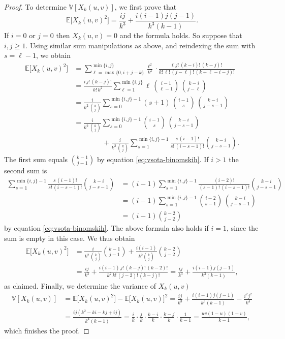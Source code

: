 \documentclass[12pt,a4paper]{amsart}
\theoremstyle{definition}
\newcommand{\EE}{\mathbb{E}}
\newcommand{\VV}{\mathbb{V}}
\begin{document}
\begin{proof}
To determine $\VV[X_k(u,v)]$, we first prove that  $$\EE\big[X_k(u,v)^2\big] = \frac{ij}{k^3} + \frac{i(i-1)j(j-1)}{k^3 (k-1)}.$$
If $i=0$ or $j=0$ then $X_k(u,v) = 0$ and the formula holds. So suppose that $i,j \ge 1$. Using similar sum manipulations as above, and reindexing the sum with $s=\ell-1$, we obtain
\begin{align*}
    \EE\big[X_k(u,v)^2\big] &= \sum_{\ell=\max \{0,  i+j-k \}}^{\min \{i,j \}} \frac{\ell^2}{k^2}\cdot \frac{i! \, j! \, (k-i)! \, (k-j)!}{k! \, \ell! \, (j-\ell)! \, (k+\ell-i-j)!} \\
    &= \frac{i \, j! \, (k-j)!}{k! \, k^2 } \sum_{\ell=1}^{\min \{ i,j \}} \ell \, \binom{i-1}{\ell-1} \, \binom{k-i}{j-\ell} \\
    &= \frac{i}{k^2 \, \binom{k}{j}} \sum_{s=0}^{\min \{ i,j \}-1} (s+1) \, \binom{i-1}{s} \, \binom{k-i}{j-s-1} \\
    &= \frac{i}{k^2 \, \binom{k}{j}} \sum_{s=0}^{\min \{ i,j \}-1} \binom{i-1}{s} \, \binom{k-i}{j-s-1} \\
    & \qquad \qquad+ \frac{i}{k^2 \, \binom{k}{j}} \sum_{s=1}^{\min \{ i,j \}-1} \frac{s \, (i-1)!}{s! \, (i-s-1)!} \binom{k-i}{j-s-1}.
\end{align*}
The first sum equals $\binom{k-1}{j-1}$ by equation \eqref{eq:vsota-binomskih}. If $i>1$ the second sum is
\begin{align*}
\sum_{s=1}^{\min \{ i,j \}-1} \frac{s \, (i-1)!}{s! \, (i-s-1)!} \binom{k-i}{j-s-1} &= (i-1)\sum_{s=1}^{\min \{ i,j \}-1} \frac{(i-2)!}{(s-1)! \, (i-s-1)!} \binom{k-i}{j-s-1} \\
&= (i-1)\sum_{s=1}^{\min \{i,j \}-1 } \binom{i-2}{s-1} \, \binom{k-i}{j-s-1} \\
&= (i-1)\binom{k-2}{j-2}
\end{align*}
by equation \eqref{eq:vsota-binomskih}. The above formula also holds if $i=1$, since the sum is empty in this case. We thus obtain
\begin{align}
    \EE\big[X_k(u,v)^2\big] &= \frac{i}{k^2 \, \binom{k}{j}} \binom{k-1}{j-1} + \frac{i(i-1)}{k^2 \binom{k}{j}} \binom{k-2}{j-2} \label{eq:E(X_k^2)}\\
    &= \frac{ij}{k^3} + \frac{i(i-1) \, j!\, (k-j)! \, (k-2)!}{k^2 \, k! \, (j-2)! \, (k-j)!} = \frac{ij}{k^3} + \frac{i(i-1)j(j-1)}{k^3 (k-1)}, \nonumber
\end{align}
as claimed. Finally, we determine the variance of $X_k(u,v)$
\begin{align*}
    \VV[X_k(u,v)] &= \EE\big[X_k(u,v)^2\big] - \EE\big[X_k(u,v)\big]^2 = \frac{ij}{k^3} + \frac{i(i-1)j(j-1)}{k^3(k-1)} - \frac{i^2 j^2}{k^4} \\
    &= \frac{ij(k^2-ki-kj+ij)}{k^4(k-1)}= \frac{i}{k}\cdot \frac{j}{k}\cdot \frac{k-i}{k}\cdot \frac{k-j}{k}\cdot \frac{1}{k-1} = \frac{uv(1-u)(1-v)}{k-1},
\end{align*}
which finishes the proof. 
\end{proof}
\end{document}
